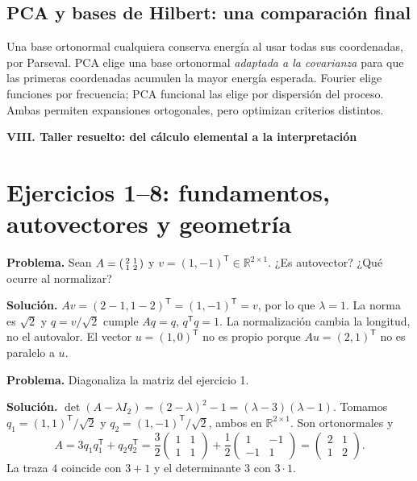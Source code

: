 \documentclass[11pt,a4paper]{article}
\newcommand{\R}{\mathbb R}
\newcommand{\T}{^{\mathsf T}}
\theoremstyle{definition}
\newcommand{\parte}[1]{\par\bigskip\Needspace{8\baselineskip}\begin{center}{\Large\bfseries\color{azul}#1}\end{center}}
\begin{document}
\subsection{PCA y bases de Hilbert: una comparación final}
Una base ortonormal cualquiera conserva energía al usar todas sus coordenadas, por Parseval. PCA elige una base ortonormal \emph{adaptada a la covarianza} para que las primeras coordenadas acumulen la mayor energía esperada. Fourier elige funciones por frecuencia; PCA funcional las elige por dispersión del proceso. Ambas permiten expansiones ortogonales, pero optimizan criterios distintos.

\parte{VIII. Taller resuelto: del cálculo elemental a la interpretación}
\section{Ejercicios 1--8: fundamentos, autovectores y geometría}
\begin{ejemplo}
\textbf{Problema.} Sean $A=\begin{psmallmatrix}2&1\\1&2\end{psmallmatrix}$ y $v=(1,-1)\T\in\R^{2\times1}$. ¿Es autovector? ¿Qué ocurre al normalizar?

\textbf{Solución.} $Av=(2-1,1-2)\T=(1,-1)\T=v$, por lo que $\lambda=1$. La norma es $\sqrt2$ y $q=v/\sqrt2$ cumple $Aq=q$, $q\T q=1$. La normalización cambia la longitud, no el autovalor. El vector $u=(1,0)\T$ no es propio porque $Au=(2,1)\T$ no es paralelo a $u$.
\end{ejemplo}
\begin{ejemplo}
\textbf{Problema.} Diagonaliza la matriz del ejercicio 1.

\textbf{Solución.} $\det(A-\lambda I_2)=(2-\lambda)^2-1=(\lambda-3)(\lambda-1)$. Tomamos $q_1=(1,1)\T/\sqrt2$ y $q_2=(1,-1)\T/\sqrt2$, ambos en $\R^{2\times1}$. Son ortonormales y
\[
A=3q_1q_1\T+q_2q_2\T
=\frac32\begin{pmatrix}1&1\\1&1\end{pmatrix}+\frac12\begin{pmatrix}1&-1\\-1&1\end{pmatrix}
=\begin{pmatrix}2&1\\1&2\end{pmatrix}.
\]
La traza $4$ coincide con $3+1$ y el determinante $3$ con $3\cdot1$.
\end{ejemplo}
\end{document}
